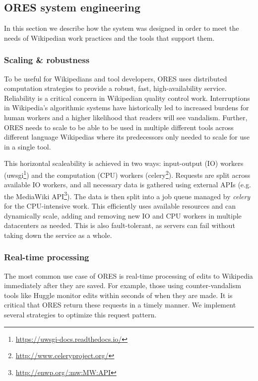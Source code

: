 \subsection{ORES system engineering}
\label{sec:ores_system_engineering}
In this section we describe how the system was designed in order to meet the needs of Wikipedian work practices and the tools that support them.

\subsubsection{Scaling \& robustness}
To be useful for Wikipedians and tool developers, ORES uses distributed computation strategies to provide a robust, fast, high-availability service.  Reliability is a critical concern in Wikipedian quality control work.  Interruptions in Wikipedia's algorithmic systems have historically led to increased burdens for human workers and a higher likelihood that readers will see vandalism\cite{geiger2013levee}.  Further, ORES needs to scale to be able to be used in multiple different tools across different language Wikipedias where its predecessors only needed to scale for use in a single tool.

This horizontal scaleability is achieved in two ways: input-output (IO) workers (uwsgi\footnote{\url{https://uwsgi-docs.readthedocs.io/}}) and the computation (CPU) workers (celery\footnote{\url{http://www.celeryproject.org/}}).  Requests are split across available IO workers, and all necessary data is gathered using external APIs (e.g. the MediaWiki API\footnote{\url{http://enwp.org/:mw:MW:API}}).  The data is then split into a job queue managed by \emph{celery} for the CPU-intensive work.  This efficiently uses available resources and can dynamically scale, adding and removing new IO and CPU workers in multiple datacenters as needed.  This is also fault-tolerant, as servers can fail without taking down the service as a whole.

\subsubsection{Real-time processing}
The most common use case of ORES is real-time processing of edits to Wikipedia immediately after they are saved.  For example, those using counter-vandalism tools like Huggle monitor edits within seconds of when they are made.  It is critical that ORES return these requests in a timely manner.  We implement several strategies to optimize this request pattern.

